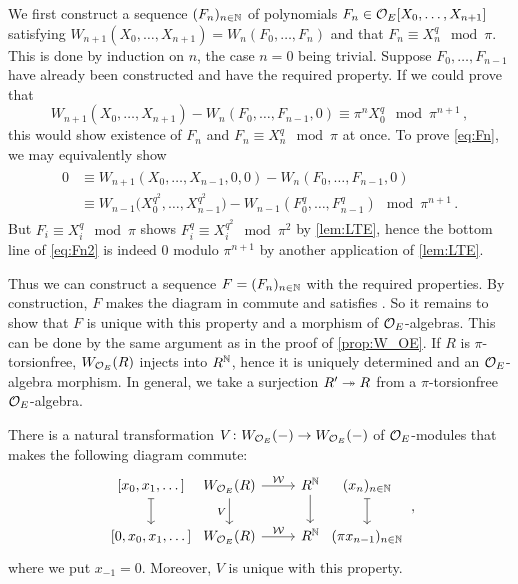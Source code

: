 \begin{proof*}
	We first construct a sequence $(F_n)_{n\in\mathbb{N}}$ of polynomials $F_n\in \mathcal{O}_E[X_0,\dotsc,X_{n+1}]$ satisfying $W_{n+1}(X_0,\dotsc,X_{n+1})=W_n(F_0,\dotsc,F_n)$ and that $F_n\equiv X_n^q\mod \pi$. This is done by induction on $n$, the case $n=0$ being trivial. Suppose $F_0,\dotsc,F_{n-1}$ have already been constructed and have the required property. If we could prove that
	\begin{equation}\label{eq:Fn}
		W_{n+1}(X_0,\dotsc,X_{n+1})-W_n(F_0,\dotsc,F_{n-1},0)\equiv \pi^n X_0^q\mod \pi^{n+1}\,,
	\end{equation}
	this would show existence of $F_n$ and $F_n\equiv X_n^q\mod \pi$ at once. To prove \cref{eq:Fn}, we may equivalently show
	\begin{align}\label{eq:Fn2}
		\begin{split}
			0&\equiv W_{n+1}(X_0,\dotsc,X_{n-1},0,0)-W_n(F_0,\dotsc,F_{n-1},0)\\
			&\equiv W_{n-1}\big(X_0^{q^2},\dotsc,X_{n-1}^{q^2}\big)-W_{n-1}\left(F_0^q,\dotsc,F_{n-1}^q\right)\mod \pi^{n+1}\,.
		\end{split}
	\end{align}
	But $F_i\equiv X_i^q\mod \pi$ shows $F_i^q\equiv X_i^{q^2}\mod \pi^2$ by \cref{lem:LTE}, hence the bottom line of \cref{eq:Fn2} is indeed $0$ modulo $\pi^{n+1}$ by another application of \cref{lem:LTE}.
	
	Thus we can construct a sequence $F=(F_n)_{n\in \mathbb{N}}$ with the required properties. By construction, $F$ makes the diagram in  commute and satisfies . So it remains to show that $F$ is unique with this property and a morphism of $\mathcal{O}_E$-algebras. This can be done by the same argument as in the proof of \cref{prop:W_OE}. If $R$ is $\pi$-torsionfree, $W_{\mathcal{O}_E}(R)$ injects into $R^{\mathbb{N}}$, hence it is uniquely determined and an $\mathcal{O}_E$-algebra morphism. In general, we take a surjection $R'\epimorphism R$ from a $\pi$-torsionfree $\mathcal{O}_E$-algebra.
\end{proof*}
\begin{lem}
	There is a natural transformation $V\colon W_{\Oo_E}(-)\morphism W_{\Oo_E}(-)$ of $\mathcal{O}_E$-modules that makes the following diagram commute:
	\begin{equation*}
		\begin{tikzcd}
			{[x_0,x_1,\dotsc]}\dar[|->] &[-2.4em] W_{\Oo_E}(R)\dar["V"{swap}]\rar["\Ww"] & R^\IN\dar &[-2.4em] (x_n)_{n\in\IN}\dar[|->]\\
			{[0,x_0,x_1,\dotsc]} &[-2.4em] W_{\Oo_E}(R) \rar["\Ww"] & R^\IN &[-2.4em] (\pi x_{n-1})_{n\in\IN}
		\end{tikzcd}\,,
	\end{equation*}
	where we put $x_{-1}=0$. Moreover, $V$ is unique with this property.
\end{lem}
